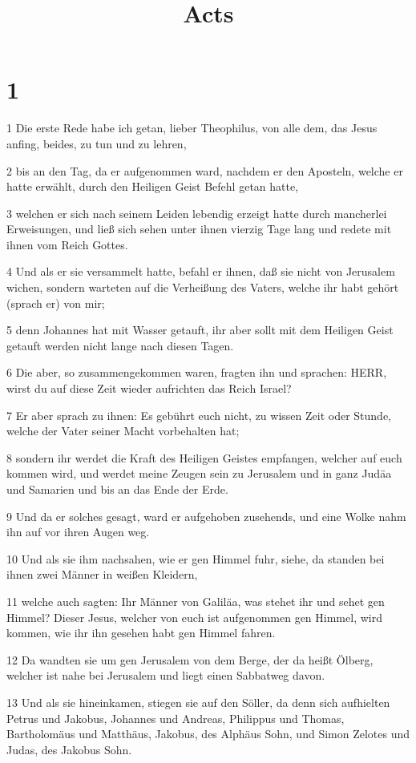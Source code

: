 

\title{Acts}


\chapter{1}

\par 1 Die erste Rede habe ich getan, lieber Theophilus, von alle dem, das Jesus anfing, beides, zu tun und zu lehren,
\par 2 bis an den Tag, da er aufgenommen ward, nachdem er den Aposteln, welche er hatte erwählt, durch den Heiligen Geist Befehl getan hatte,
\par 3 welchen er sich nach seinem Leiden lebendig erzeigt hatte durch mancherlei Erweisungen, und ließ sich sehen unter ihnen vierzig Tage lang und redete mit ihnen vom Reich Gottes.
\par 4 Und als er sie versammelt hatte, befahl er ihnen, daß sie nicht von Jerusalem wichen, sondern warteten auf die Verheißung des Vaters, welche ihr habt gehört (sprach er) von mir;
\par 5 denn Johannes hat mit Wasser getauft, ihr aber sollt mit dem Heiligen Geist getauft werden nicht lange nach diesen Tagen.
\par 6 Die aber, so zusammengekommen waren, fragten ihn und sprachen: HERR, wirst du auf diese Zeit wieder aufrichten das Reich Israel?
\par 7 Er aber sprach zu ihnen: Es gebührt euch nicht, zu wissen Zeit oder Stunde, welche der Vater seiner Macht vorbehalten hat;
\par 8 sondern ihr werdet die Kraft des Heiligen Geistes empfangen, welcher auf euch kommen wird, und werdet meine Zeugen sein zu Jerusalem und in ganz Judäa und Samarien und bis an das Ende der Erde.
\par 9 Und da er solches gesagt, ward er aufgehoben zusehends, und eine Wolke nahm ihn auf vor ihren Augen weg.
\par 10 Und als sie ihm nachsahen, wie er gen Himmel fuhr, siehe, da standen bei ihnen zwei Männer in weißen Kleidern,
\par 11 welche auch sagten: Ihr Männer von Galiläa, was stehet ihr und sehet gen Himmel? Dieser Jesus, welcher von euch ist aufgenommen gen Himmel, wird kommen, wie ihr ihn gesehen habt gen Himmel fahren.
\par 12 Da wandten sie um gen Jerusalem von dem Berge, der da heißt Ölberg, welcher ist nahe bei Jerusalem und liegt einen Sabbatweg davon.
\par 13 Und als sie hineinkamen, stiegen sie auf den Söller, da denn sich aufhielten Petrus und Jakobus, Johannes und Andreas, Philippus und Thomas, Bartholomäus und Matthäus, Jakobus, des Alphäus Sohn, und Simon Zelotes und Judas, des Jakobus Sohn.
